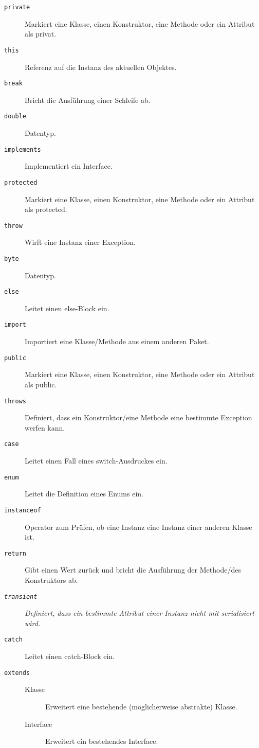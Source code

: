 \begin{description}
        \item[\texttt{private}] Markiert eine Klasse, einen Konstruktor, eine Methode oder ein Attribut als privat.
        \item[\texttt{this}] Referenz auf die Instanz des aktuellen Objektes.
        \item[\texttt{break}] Bricht die Ausführung einer Schleife ab.
        \item[\texttt{double}] Datentyp.
        \item[\texttt{implements}] Implementiert ein Interface.
        \item[\texttt{protected}] Markiert eine Klasse, einen Konstruktor, eine Methode oder ein Attribut als protected.
        \item[\texttt{throw}] Wirft eine Instanz einer Exception.
        \item[\texttt{byte}] Datentyp.
        \item[\texttt{else}] Leitet einen else-Block ein.
        \item[\texttt{import}] Importiert eine Klasse/Methode aus einem anderen Paket.
        \item[\texttt{public}]  Markiert eine Klasse, einen Konstruktor, eine Methode oder ein Attribut als public.
        \item[\texttt{throws}] Definiert, dass ein Konstruktor/eine Methode eine bestimmte Exception werfen kann.
        \item[\texttt{case}] Leitet einen Fall eines switch-Ausdruckes ein.
        \item[\texttt{enum}] Leitet die Definition eines Enums ein.
        \item[\texttt{instanceof}] Operator zum Prüfen, ob eine Instanz eine Instanz einer anderen Klasse ist.
        \item[\texttt{return}] Gibt einen Wert zurück und bricht die Ausführung der Methode/des Konstruktors ab.
        \item[\textit{\texttt{transient}}] \textit{Definiert, dass ein bestimmte Attribut einer Instanz nicht mit serialisiert wird.}
        \item[\texttt{catch}] Leitet einen catch-Block ein.
        \item[\texttt{extends}]
	        \begin{description}
	        	\item[Klasse] Erweitert eine bestehende (möglicherweise abstrakte) Klasse.
	        	\item[Interface] Erweitert ein bestehendes Interface.

\end{description}
\end{description}
